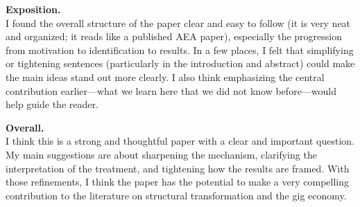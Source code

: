 \documentclass[12pt]{article}
\begin{document}
\vspace{0.5em}
\noindent \textbf{Exposition.} \\
I found the overall structure of the paper clear and easy to follow (it is very neat and organized; it reads like a published AEA paper), especially the progression from motivation to identification to results. In a few places, I felt that simplifying or tightening sentences (particularly in the introduction and abstract) could make the main ideas stand out more clearly. I also think emphasizing the central contribution earlier—what we learn here that we did not know before—would help guide the reader.

\vspace{0.5em}
\noindent \textbf{Overall.} \\
I think this is a strong and thoughtful paper with a clear and important question. My main suggestions are about sharpening the mechanism, clarifying the interpretation of the treatment, and tightening how the results are framed. With those refinements, I think the paper has the potential to make a very compelling contribution to the literature on structural transformation and the gig economy.
\end{document}

